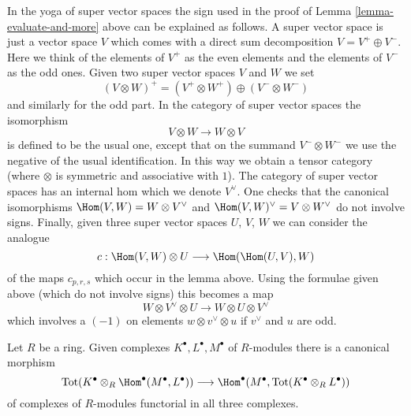 \begin{remark}
\label{remark-sign-explanation}
In the yoga of super vector spaces the sign used in the proof
of Lemma \ref{lemma-evaluate-and-more} above can be explained
as follows. A super vector space is just a vector space
$V$ which comes with a direct sum decomposition $V = V^+ \oplus V^-$.
Here we think of the elements of $V^+$ as the even elements
and the elements of $V^-$ as the odd ones. Given two super
vector spaces $V$ and $W$ we set
$$
(V \otimes W)^+ = (V^+ \otimes W^+) \oplus (V^- \otimes W^-)
$$
and similarly for the odd part. In the category of super vector
spaces the isomorphism
$$
V \otimes W \longrightarrow W \otimes V
$$
is defined to be the usual one, except that on the summand
$V^- \otimes W^-$ we use the negative of the usual identification.
In this way we obtain a tensor category (where $\otimes$ is symmetric
and associative with $1$). The category of super vector spaces has
an internal hom which we denote $V^\vee$. One checks that the
canonical isomorphisms $\Hom(V, W) = W \otimes V^\vee$
and $\Hom(V, W)^\vee = V \otimes W^\vee$ do not involve signs.
Finally, given three super vector spaces
$U$, $V$, $W$ we can consider the analogue
$$
c : \Hom(V, W) \otimes U \longrightarrow \Hom(\Hom(U, V), W)
$$
of the maps $c_{p, r, s}$ which occur in the lemma above.
Using the formulae given above (which do not involve signs)
this becomes a map
$$
W \otimes V^\vee \otimes U
\longrightarrow
W \otimes U \otimes V^\vee
$$
which involves a $(-1)$ on elements $w \otimes v^\vee \otimes u$
if $v^\vee$ and $u$ are odd.
\end{remark}

\begin{lemma}
\label{lemma-diagonal-better}
Let $R$ be a ring. Given complexes $K^\bullet, L^\bullet, M^\bullet$
of $R$-modules there is a canonical morphism
$$
\text{Tot}(K^\bullet \otimes_R \Hom^\bullet(M^\bullet, L^\bullet))
\longrightarrow
\Hom^\bullet(M^\bullet, \text{Tot}(K^\bullet \otimes_R L^\bullet))
$$
of complexes of $R$-modules functorial in all three complexes.
\end{lemma}

